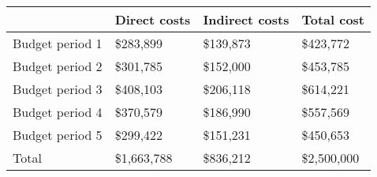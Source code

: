\begin{tabular}{llll}
\hline
{} &   Direct costs & Indirect costs &     Total cost \\
\hline
Budget period 1 &    \$283,899 &     \$139,873 &    \$423,772 \\
Budget period 2 &    \$301,785 &     \$152,000 &    \$453,785 \\
Budget period 3 &    \$408,103 &     \$206,118 &    \$614,221 \\
Budget period 4 &    \$370,579 &     \$186,990 &    \$557,569 \\
Budget period 5 &    \$299,422 &     \$151,231 &    \$450,653 \\\hline
Total           &  \$1,663,788 &           \$836,212 &  \$2,500,000 \\
\hline
\end{tabular}
